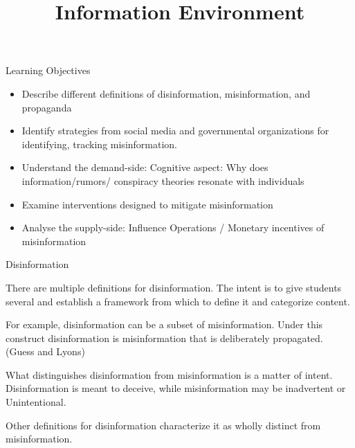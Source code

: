 \documentclass[nobackground,dvipsnames,table]{beamer}
\title[Information Environment]{Information Environment}
\author[]{}
\date[2023]{}
\begin{document}

\begin{frame}
	\titlepage
\end{frame}


\begin{frame}{Learning Objectives}

\begin{itemize}
    \item Describe different definitions of disinformation, misinformation, and propaganda
    \item Identify strategies from social media and governmental organizations for identifying, tracking misinformation.
    \item Understand the demand-side: Cognitive aspect: Why does information/rumors/ conspiracy theories resonate with individuals
    \item Examine interventions designed to mitigate misinformation
    \item Analyse the supply-side: Influence Operations / Monetary incentives of misinformation
\end{itemize}
\end{frame}

\begin{frame}{Disinformation}

\small{
There are multiple definitions for disinformation.  The intent is to give students several and establish a framework from which to define it and categorize content.
 
For example, disinformation can be a subset of misinformation.  Under this construct disinformation is misinformation that is deliberately propagated. (Guess and Lyons)

What distinguishes disinformation from misinformation is a matter of intent. Disinformation is meant to deceive, while misinformation may be inadvertent or
Unintentional.

Other definitions for disinformation characterize it as wholly distinct from misinformation.
}

\end{frame}
\end{document}
